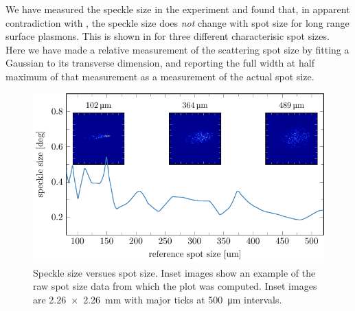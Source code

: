 We have measured the speckle size in the experiment and found that, in
apparent contradiction with , the speckle size does
\textit{not} change with spot size for long range surface plasmons.  This
is shown in  for three different characterisic spot
sizes.  Here we have made a relative measurement of the scattering spot
size by fitting a Gaussian to its transverse dimension, and reporting the
full width at half maximum of that measurement as a measurement of the
actual spot size.
\begin{figure}[ht]
 \centering
 \includegraphics[keepaspectratio]{speckle/figures/spotsize/test.pdf}
 \caption{Speckle size versues spot size.  Inset images show an example of
 the raw spot size data from which the plot was computed.  Inset images are
 \SI{2.26x2.26}{\milli\meter} with major ticks at
 \SI{500}{\micro\meter} intervals.}
 \label{fig:spotsize}
\end{figure}


